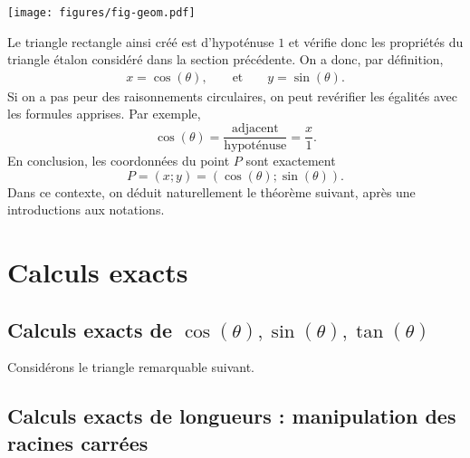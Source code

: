 	\begin{center}
	\texttt{[image: figures/fig-geom.pdf]}
	\end{center}

Le triangle rectangle ainsi créé est d'hypoténuse $1$ et vérifie donc les propriétés du triangle étalon considéré dans la section précédente.
On a donc, par définition,
	\begin{align*}
		x = \cos(\theta), && \text{ et } && y = \sin(\theta).
	\end{align*}
Si on a pas peur des raisonnements circulaires, on peut revérifier les égalités avec les formules apprises.
Par exemple,
	\[
		\cos(\theta) = \dfrac{\text{adjacent}}{\text{hypoténuse}} = \dfrac{x}{1}.
	\]
En conclusion, les coordonnées du point $P$ sont exactement
	\[ P = (x ; y) = \left( \cos(\theta) ; \sin(\theta) \right). \]
Dans ce contexte, on déduit naturellement le théorème suivant, après une introductions aux notations.






\section{Calculs exacts}

\subsection{Calculs exacts de $\cos(\theta), \sin(\theta), \tan(\theta)$}

Considérons le triangle remarquable suivant.

\subsection{Calculs exacts de longueurs : manipulation des racines carrées}

